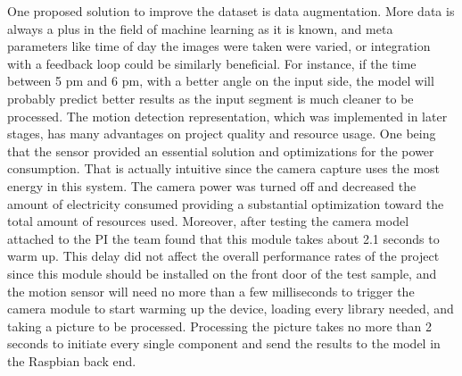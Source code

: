 \documentclass[11pt,twocolumn]{article}
\begin{document}
{	One proposed solution to improve the dataset is data augmentation. More data is always a plus in the field of machine learning as it is known, and meta parameters like time of day the images were taken were varied, or integration with a feedback loop could be similarly beneficial. For instance, if the time between 5 pm and 6 pm, with a better angle on the input side, the model will probably predict better results as the input segment is much cleaner to be processed. The motion detection representation, which was implemented in later stages, has many advantages on project quality and resource usage. One being that the sensor provided an essential solution and optimizations for the power consumption. That is actually intuitive since the camera capture uses the most energy in this system. The camera power was turned off and decreased the amount of electricity consumed providing a substantial optimization toward the total amount of resources used. Moreover, after testing the camera model attached to the PI the team found that this module takes about 2.1 seconds to warm up. This delay did not affect the overall performance rates of the project since this module should be installed on the front door of the test sample, and the motion sensor will need no more than a few milliseconds to trigger the camera module to start warming up the device, loading every library needed, and taking a picture to be processed. Processing the picture takes no more than 2 seconds to initiate every single component and send the results to the model in the Raspbian back end.}
\end{document}
